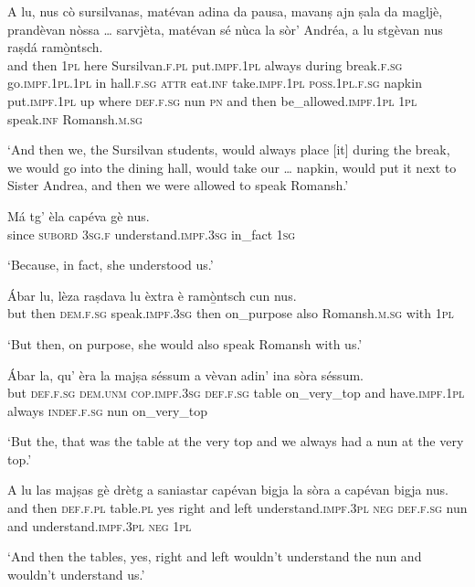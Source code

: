 \begin{linenumbers}
\gll A lu, nus cò sursilvanas, matévan adina da pausa, mavanṣ ajn ṣala da magljè, prandèvan nòssa … sarvjèta, matévan sé nùca la sòr’ Andréa, a lu stgèvan nus raṣdá ramò̱ntsch.\\
and then \textsc{1pl} here Sursilvan.\textsc{f.pl} put.\textsc{impf.1pl} always during break.\textsc{f.sg} go.\textsc{impf.1pl.1pl} in hall.\textsc{f.sg} \textsc{attr} eat.\textsc{inf} take.\textsc{impf.1pl} \textsc{poss.1pl.f.sg} {} napkin put.\textsc{impf.1pl} up  where \textsc{def.f.sg} nun \textsc{pn} and then be\_allowed.\textsc{impf.1pl} \textsc{1pl} speak.\textsc{inf} Romansh.\textsc{m.sg}\\
\end{linenumbers}
\medskip
\glt `And then we, the Sursilvan students, would always place [it] during the break, we would go into the dining hall, would take our … napkin, would put it next to Sister Andrea, and then we were allowed to speak Romansh.'
\medskip

\begin{linenumbers}
\gll    Má tg’ èla capéva gè nus.\\
since \textsc{subord} \textsc{3sg.f} understand.\textsc{impf.3sg} in\_fact \textsc{1sg}  \\
\end{linenumbers}
\medskip
\glt `Because, in fact, she understood us.'
\medskip

\begin{linenumbers}
\gll    Ábar lu, lèza raṣdava lu èxtra è ramò̱ntsch cun nus.\\
but then \textsc{dem.f.sg} speak.\textsc{impf.3sg} then on\_purpose also Romansh.\textsc{m.sg} with \textsc{1pl}\\
\end{linenumbers}
\medskip
\glt `But then, on purpose, she would also speak Romansh with us.'
\medskip

\begin{linenumbers}
\gll    Ábar la, qu’ èra la majṣa séssum a vèvan adin’ ina sòra séssum.\\
but \textsc{def.f.sg} \textsc{dem.unm} \textsc{cop.impf.3sg} \textsc{def.f.sg} table on\_very\_top and have.\textsc{impf.1pl} always \textsc{indef.f.sg} nun on\_very\_top\\
\end{linenumbers}
\medskip
\glt `But the, that was the table at the very top and we always had a nun at the very top.'
\medskip

\begin{linenumbers}
\gll    A lu las majṣas gè drètg a saniastar capévan bigja la sòra a capévan bigja nus.\\
and then \textsc{def.f.pl} table.\textsc{pl} yes right and left understand.\textsc{impf.3pl} \textsc{neg} \textsc{def.f.sg} nun and understand.\textsc{impf.3pl} \textsc{neg} \textsc{1pl}\\
\end{linenumbers}
\medskip
\glt `And then the tables, yes, right and left wouldn’t understand the nun and wouldn’t understand us.'
\medskip

